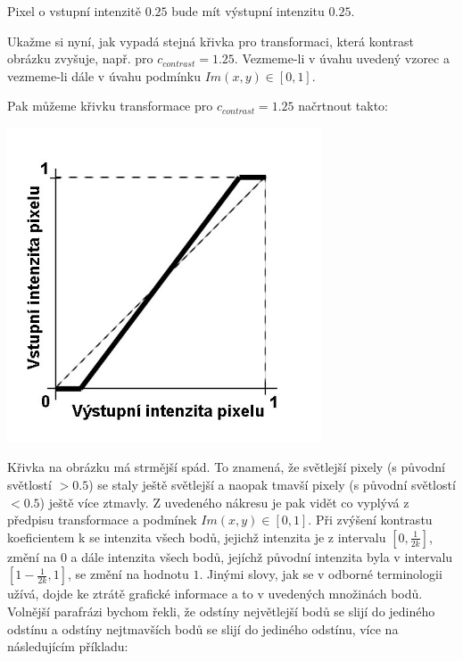 Pixel o vstupní intenzitě $0.25$ bude mít výstupní intenzitu $0.25$.

Ukažme si nyní, jak vypadá stejná křivka pro transformaci, která kontrast obrázku zvyšuje, např. pro $ c_{contrast}=1.25 $.
Vezmeme-li v úvahu uvedený vzorec a vezmeme-li dále v úvahu podmínku $ Im(x,y) \in [0,1] $.

Pak můžeme křivku transformace pro $ c_{contrast}=1.25 $ načrtnout takto:

\includegraphics[width=0.7\textwidth,height=0.7\textwidth]{Text/IMG/Kontrast_Transformace_1.jpg}

Křivka na obrázku má strmější spád. To znamená, že světlejší pixely (s původní světlostí $> 0.5$) se staly ještě světlejší a naopak tmavší pixely (s původní světlostí $< 0.5$) ještě více ztmavly. Z uvedeného nákresu je pak vidět co vyplývá z předpisu transformace a podmínek $ Im(x,y) \in [0,1]$. Při zvýšení kontrastu koeficientem k se intenzita všech bodů, jejichž intenzita je z intervalu $ [0,\frac{1}{2k}] $, změní na $0$ a dále intenzita všech bodů, jejíchž původní intenzita byla v intervalu $[1-\frac{1}{2k},1]$, se změní na hodnotu $1$. Jinými slovy, jak se v odborné terminologii užívá, dojde ke ztrátě grafické informace a to v uvedených množinách bodů. Volnější parafrázi bychom řekli, že odstíny největlejší bodů se slijí do jediného odstínu a odstíny nejtmavších bodů se slijí do jediného odstínu, více na následujícím příkladu:

